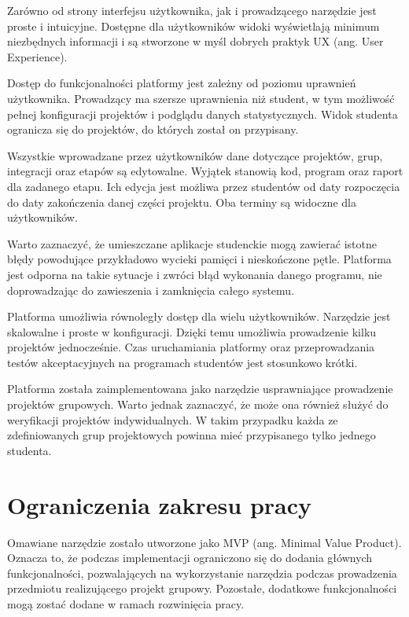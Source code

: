 Zarówno od strony interfejsu użytkownika, jak i prowadzącego narzędzie jest proste i intuicyjne.
Dostępne dla użytkowników widoki wyświetlają minimum niezbędnych informacji i są stworzone w myśl dobrych praktyk UX (ang. User Experience).

Dostęp do funkcjonalności platformy jest zależny od poziomu uprawnień użytkownika.
Prowadzący ma szersze uprawnienia niż student, w tym możliwość pełnej konfiguracji projektów i podglądu danych statystycznych.
Widok studenta ogranicza się do projektów, do których został on przypisany.

Wszystkie wprowadzane przez użytkowników dane dotyczące projektów, grup, integracji oraz etapów są edytowalne.
Wyjątek stanowią kod, program oraz raport dla zadanego etapu.
Ich edycja jest możliwa przez studentów od daty rozpoczęcia do daty zakończenia danej części projektu.
Oba terminy są widoczne dla użytkowników.

Warto zaznaczyć, że umieszczane aplikacje studenckie mogą zawierać istotne błędy powodujące przykładowo wycieki pamięci i nieskończone pętle.
Platforma jest odporna na takie sytuacje i zwróci błąd wykonania danego programu, nie doprowadzając do zawieszenia i zamknięcia całego systemu.

Platforma umożliwia równoległy dostęp dla wielu użytkowników.
Narzędzie jest skalowalne i proste w konfiguracji.
Dzięki temu umożliwia prowadzenie kilku projektów jednocześnie.
Czas uruchamiania platformy oraz przeprowadzania testów akceptacyjnych na programach studentów jest stosunkowo krótki.

Platforma została zaimplementowana jako narzędzie usprawniające prowadzenie projektów grupowych.
Warto jednak zaznaczyć, że może ona również służyć do weryfikacji projektów indywidualnych.
W takim przypadku każda ze zdefiniowanych grup projektowych powinna mieć przypisanego tylko jednego studenta.


\section{Ograniczenia zakresu pracy}

Omawiane narzędzie zostało utworzone jako MVP (ang. Minimal Value Product).
Oznacza to, że podczas implementacji ograniczono się do dodania głównych funkcjonalności, pozwalających na wykorzystanie narzędzia podczas prowadzenia przedmiotu realizującego projekt grupowy.
Pozostałe, dodatkowe funkcjonalności mogą zostać dodane w ramach rozwinięcia pracy.

